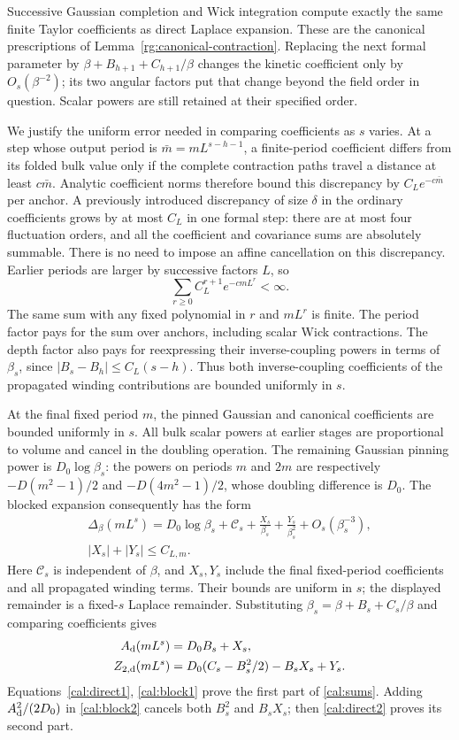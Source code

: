 Successive Gaussian completion and Wick integration compute exactly
the same finite Taylor coefficients as direct Laplace expansion. These
are the canonical prescriptions of Lemma~\ref{rg:canonical-contraction}.
Replacing the next formal parameter by
$\beta+B_{h+1}+C_{h+1}/\beta$ changes the kinetic coefficient only by
$O_s(\beta^{-2})$; its two angular factors put that change beyond the
field order in question. Scalar powers are still retained at their
specified order.

We justify the uniform error needed in comparing coefficients as $s$
varies. At a step whose output period is $\bar m=mL^{s-h-1}$, a
finite-period coefficient differs from its folded bulk value only if
the complete contraction paths travel a distance at least
$c\bar m$. Analytic coefficient norms therefore bound this discrepancy
by $C_Le^{-c\bar m}$ per anchor. A previously introduced discrepancy
of size $\delta$ in the ordinary coefficients grows by at most $C_L$
in one formal step: there are at most four fluctuation orders, and all
the coefficient and covariance sums are absolutely summable. There is
no need to impose an affine cancellation on this discrepancy.
Earlier periods are larger by successive factors $L$, so
\[
 \sum_{r\ge0}C_L^{r+1}e^{-cmL^r}<\infty.
\]
The same sum with any fixed polynomial in $r$ and $mL^r$ is finite.
The period factor pays for the sum over anchors, including scalar
Wick contractions. The depth factor also pays for reexpressing their
inverse-coupling powers in terms of $\beta_s$, since
$|B_s-B_h|\le C_L(s-h)$. Thus both inverse-coupling coefficients of
the propagated winding contributions are bounded uniformly in $s$.

At the final fixed period $m$, the pinned Gaussian and canonical
coefficients are bounded uniformly in $s$. All bulk scalar powers at
earlier stages are proportional to volume and cancel in the doubling
operation. The remaining Gaussian pinning power is
$D_0\log\beta_s$: the powers on periods $m$ and $2m$ are respectively
$-D(m^2-1)/2$ and $-D(4m^2-1)/2$, whose doubling difference is $D_0$.
The blocked expansion consequently has the form
\[
 \begin{gathered}
 \Delta_\beta(mL^s)
 =D_0\log\beta_s+\mathcal C_s
       +\frac{X_s}{\beta_s}+\frac{Y_s}{\beta_s^2}
       +O_s(\beta_s^{-3}),\\
 |X_s|+|Y_s|\le C_{L,m}.
 \end{gathered}
\]
Here $\mathcal C_s$ is independent of $\beta$, and $X_s,Y_s$ include
the final fixed-period coefficients and all propagated winding terms.
Their bounds are uniform in $s$; the displayed remainder is a
fixed-$s$ Laplace remainder. Substituting
$\beta_s=\beta+B_s+C_s/\beta$ and comparing coefficients gives
\begin{align}
 A_{\rm d}(mL^s)&=D_0B_s+X_s,\label{cal:block1}\\
 Z_{2,\rm d}(mL^s)&=D_0(C_s-B_s^2/2)-B_sX_s+Y_s.
 \label{cal:block2}
\end{align}
Equations~\eqref{cal:direct1}, \eqref{cal:block1} prove the first part
of \eqref{cal:sums}. Adding $A_{\rm d}^2/(2D_0)$ in
\eqref{cal:block2} cancels both $B_s^2$ and $B_sX_s$; then
\eqref{cal:direct2} proves its second part.

